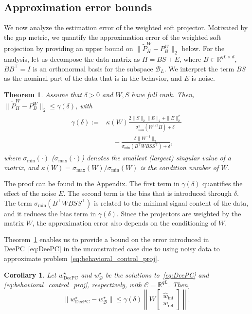 \documentclass[letterpaper, 10 pt, conference]{ieeeconf}
\newtheorem{thm}{Theorem}
\newtheorem{cor}{Corollary}
\begin{document}
\subsection{Approximation error bounds}
We now analyze the estimation error of the weighted soft projector.
Motivated by the gap metric, we quantify the approximation error of the weighted soft projection by providing an upper bound on $\|\tilde{P}_H^W - P_B^W\|_2$ below. For the analysis, let us decompose the data matrix as $H = BS + E$, where $B\in\mathbb{R}^{qL\times d}$, $BB^\top = I$ is an orthonormal basis for the subspace $\mathcal{B}_L$. 
We interpret the term $BS$ as the nominal part of the data that is in the behavior, and $E$ is noise.
\begin{thm} \label{thm:bound}
Assume that $\delta>0$ and $W,S$ have full rank. Then, $\|\tilde{P}_H^W - P_B^W\|_2 \leq \gamma(\delta)$, with
    \begin{align}
    \begin{split}
        \gamma(\delta):=&\kappa(W)\frac{2\|S\|_2\|E\|_2 + \|E\|_2^2}{\sigma_\mathrm{min}^2(W^{1/2}H) + \delta} \\
        &\quad + \frac{\delta \|W^{-1}\|_2}{\sigma_\mathrm{min}(B^\top W BSS^\top) + \delta},
    \end{split}
    \end{align}
    where $\sigma_\mathrm{min}(\cdot)$ ($\sigma_\mathrm{max}(\cdot)$) denotes the smallest (largest) singular value of a matrix, and $\kappa(W) = \sigma_\mathrm{max}(W)/\sigma_\mathrm{min}(W)$ is the condition number of $W$.
\end{thm}

The proof can be found in the Appendix. 
The first term in $\gamma(\delta)$ quantifies the effect of the noise $E$. The second term is the bias that is introduced through $\delta$.
The term $\sigma_\mathrm{min}(B^\top WBSS^\top)$ is related to the minimal signal content of the data, and it reduces the bias term in $\gamma(\delta)$.
Since the projectors are weighted by the matrix $W$, the approximation error also depends on the conditioning of $W$.


Theorem~\ref{thm:bound} enables us to provide a bound on the error introduced in \gls{DeePC}~\eqref{eq:DeePC} in the unconstrained case due to using noisy data to approximate problem~\eqref{eq:behavioral_control_proj}.
\begin{cor}
    Let $w^\star_\mathrm{DeePC}$ and $w^\star_\mathcal{B}$ be the solutions to~\eqref{eq:DeePC} and \eqref{eq:behavioral_control_proj}, respectively, with $\mathcal{C}=\mathbb{R}^{qL}$.
    Then,
    $$
    \|w^\star_\mathrm{DeePC} - w^\star_\mathcal{B}\| \leq \gamma(\delta)\left\|W \begin{bmatrix}
        \hat{w}_\mathrm{ini} \\ w_\mathrm{ref}
    \end{bmatrix} \right\|.
    $$
\end{cor}
\end{document}
